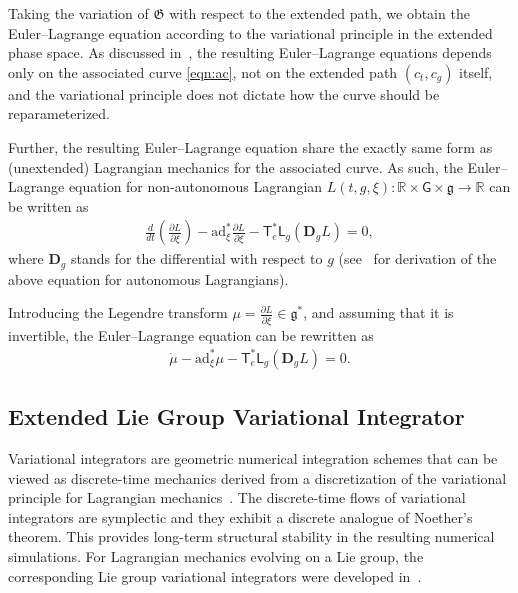 \documentclass[letterpaper, 10pt, conference]{ieeeconf}
\newcommand{\parenth}[1]{\ensuremath{\left( #1 \right)}}
\newcommand{\deriv}[2]{\ensuremath{\frac{\partial #1}{\partial #2}}}
\newcommand{\G}{\ensuremath{\mathsf{G}}}
\newcommand{\T}{\ensuremath{\mathsf{T}}}
\renewcommand{\L}{\ensuremath{\mathsf{L}}}
\renewcommand{\Re}{\ensuremath{\mathbb{R}}}
\newcommand{\D}{\ensuremath{\mathbf{D}}}
\newcommand{\ad}{\ensuremath{\mathrm{ad}}}
\newcommand{\g}{\ensuremath{\mathfrak{g}}}
\begin{document}
Taking the variation of $\mathfrak{G}$ with respect to the extended path, we obtain the Euler--Lagrange equation according to the variational principle in the extended phase space. 
As discussed in~\cite[Sec. 4.2.2]{MarWesAN01}, the resulting Euler--Lagrange equations depends only on the associated curve \eqref{eqn:ac}, not on the extended path $(c_t,c_g)$ itself, and the variational principle does not dictate how the curve should be reparameterized. 

Further, the resulting Euler--Lagrange equation share the exactly same form as (unextended) Lagrangian mechanics for the associated curve. 
As such, the Euler--Lagrange equation for non-autonomous Lagrangian $L(t,g,\xi):\Re\times\G\times\g\rightarrow \Re$ can be written as
\begin{align}
    \frac{d}{dt}\!\parenth{\deriv{L}{\xi}} - \ad^*_\xi \deriv{L}{\xi} - \T^*_e \L_g (\D_g L) = 0, \label{eqn:EL}
\end{align}
where $\D_g$ stands for the differential with respect to $g$ (see~\cite[Sec. 8.6.3]{LeeLeo17} for derivation of the above equation for autonomous Lagrangians).

Introducing the Legendre transform $\mu = \deriv{L}{\xi} \in\g^*$, and assuming that it is invertible, the Euler--Lagrange equation can be rewritten as
\begin{align}
    \dot \mu - \ad^*_{\xi} \mu - \T^*_e \L_g (\D_g L) = 0. \label{eqn:HE}
\end{align}

\subsection{Extended Lie Group Variational Integrator}

Variational integrators are geometric numerical integration schemes that can be viewed as discrete-time mechanics derived from a discretization of the variational principle for Lagrangian mechanics~\cite{MarWesAN01}.
The discrete-time flows of variational integrators are symplectic and they exhibit a discrete analogue of Noether's theorem. %
This provides long-term structural stability in the resulting numerical simulations. 
For Lagrangian mechanics evolving on a Lie group, the corresponding Lie group variational integrators were developed in~\cite{LeeLeoCMAME07}.
\end{document}

